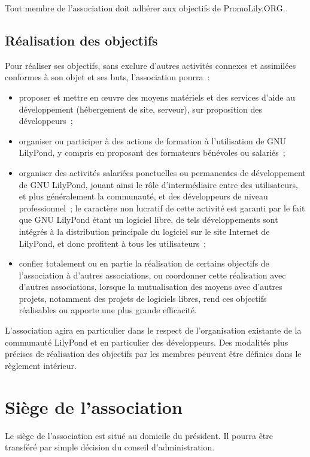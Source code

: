 \documentclass[a4wide,12pt]{scrartcl}
\newcommand{\nomAssoc}{PromoLily.ORG\xspace}
\begin{document}
Tout membre de l'association doit adhérer aux objectifs de \nomAssoc.

\subsection{Réalisation des objectifs}

Pour réaliser ses objectifs, sans exclure d'autres activités connexes
et assimilées conformes à son objet et ses buts, l'association pourra~:
\begin{itemize}
\item proposer et mettre en œuvre des moyens matériels et des services
  d'aide au développement (hébergement de site, serveur), sur
  proposition des développeurs~;
\item organiser ou participer à des actions de formation à
  l'utilisation de GNU LilyPond, y compris en proposant des formateurs
  bénévoles ou salariés~;
\item organiser des activités salariées ponctuelles ou permanentes de
  développement de GNU LilyPond, jouant ainsi le rôle d'intermédiaire
  entre des utilisateurs, et plus généralement la communauté, et des
  développeurs de niveau professionnel~; le caractère non lucratif de
  cette activité est garanti par le fait que GNU LilyPond étant un
  logiciel libre, de tels développements sont intégrés à la
  distribution principale du logiciel sur le site Internet de
  LilyPond, et donc profitent à tous les utilisateurs~;
\item confier totalement ou en partie la réalisation de certains
  objectifs de l'association à d'autres associations, ou coordonner
  cette réalisation avec d'autres associations, lorsque la
  mutualisation des moyens avec d'autres projets, notamment des
  projets de logiciels libres, rend ces objectifs réalisables ou
  apporte une plus grande efficacité.
\end{itemize}

L'association agira en particulier dans le respect de l'organisation
existante de la communauté LilyPond et en particulier des
développeurs. Des modalités plus précises de réalisation des objectifs
par les membres peuvent être définies dans le règlement intérieur.

\section{Siège de l'association}

Le siège de l'association est situé au domicile du président. Il
pourra être transféré par simple décision du conseil d'administration.
\end{document}
